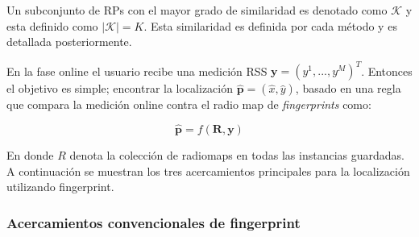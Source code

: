 Un subconjunto de RPs con el mayor grado de similaridad es denotado como \(\mathcal{K}\) y esta definido como \(\mathcal{|K|} = K\). Esta similaridad es definida por cada método y es detallada posteriormente.

En la fase online el usuario recibe una medición RSS \quad \(\textbf{y} = (y^{1}, ..., y^{M}) ^{T}\). Entonces el objetivo es simple; encontrar la localización \(\hat{\textbf{p}} = ( \hat{x}, \hat{y})\), basado en una regla que compara la medición online contra el radio map de \textit{fingerprints} como: 

\begin{equation}
\hat{\textbf{p}} = f(\textbf{R}, \textbf{y})
\end{equation}

En donde \(R\) denota la colección de radiomaps en todas las instancias guardadas. A continuación se muestran los tres acercamientos principales para la localización utilizando fingerprint.

\subsubsection{Acercamientos convencionales de fingerprint}

